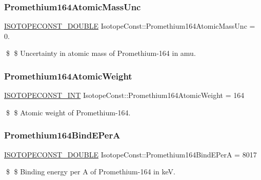\subsubsection{\texorpdfstring{Promethium164\+Atomic\+Mass\+Unc}{Promethium164AtomicMassUnc}}
{\footnotesize\ttfamily \mbox{\hyperlink{group___isotope_const-_macros_ga8f45a7272ce02c0b4c65c44636ed719a}{I\+S\+O\+T\+O\+P\+E\+C\+O\+N\+S\+T\+\_\+\+D\+O\+U\+B\+LE}} Isotope\+Const\+::\+Promethium164\+Atomic\+Mass\+Unc = 0.}

\$ \$ Uncertainty in atomic mass of Promethium-\/164 in amu. \mbox{\label{group___isotope_const-_promethium-_pm164_gab2016691bce3f3d8f3602505b1bff2e6}} 
\subsubsection{\texorpdfstring{Promethium164\+Atomic\+Weight}{Promethium164AtomicWeight}}
{\footnotesize\ttfamily \mbox{\hyperlink{group___isotope_const-_macros_ga5f18360b3e99483a35c32d789e62621c}{I\+S\+O\+T\+O\+P\+E\+C\+O\+N\+S\+T\+\_\+\+I\+NT}} Isotope\+Const\+::\+Promethium164\+Atomic\+Weight = 164}

\$ \$ Atomic weight of Promethium-\/164. \mbox{\label{group___isotope_const-_promethium-_pm164_ga9d858cb5214df1c45ba7d78837822be0}} 
\subsubsection{\texorpdfstring{Promethium164\+Bind\+E\+PerA}{Promethium164BindEPerA}}
{\footnotesize\ttfamily \mbox{\hyperlink{group___isotope_const-_macros_ga8f45a7272ce02c0b4c65c44636ed719a}{I\+S\+O\+T\+O\+P\+E\+C\+O\+N\+S\+T\+\_\+\+D\+O\+U\+B\+LE}} Isotope\+Const\+::\+Promethium164\+Bind\+E\+PerA = 8017}

\$ \$ Binding energy per A of Promethium-\/164 in keV. \mbox{\label{group___isotope_const-_promethium-_pm164_gafd3dfbb499b587c9133bb84f851737e3}} 

